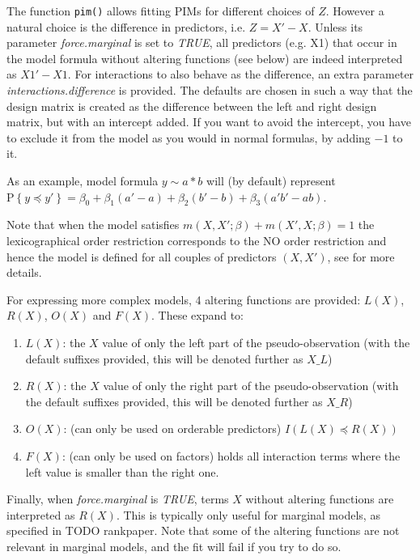 \documentclass[12pt]{article}
\newcommand{\prob}[1]{\text{P}\left\{#1\right\}}
\newcommand{\leqs}{\preccurlyeq}
\begin{document}
The function \texttt{pim()} allows fitting PIMs for different choices of $Z$. However a natural choice is the difference in predictors, i.e. $Z = X' - X$. Unless its parameter \emph{force.marginal} is set to \emph{TRUE}, all predictors (e.g. X1) that occur in the model formula without altering functions (see below) are indeed interpreted as $X1' - X1$. For interactions to also behave as the difference, an extra parameter \emph{interactions.difference} is provided. The defaults are chosen in such a way that the design matrix is created as the difference between the left and right design matrix, but with an intercept added. If you want to avoid the intercept, you have to exclude it from the model as you would in normal formulas, by adding $-1$ to it.

As an example, model formula $y\sim a*b$ will (by default) represent $\prob{y \leqs y' }=\beta_0+\beta_1  (a'-a) + \beta_2  (b'-b) + \beta_3  (a'b' - ab)$.

Note that when the model satisfies $m(X,X';\beta) + m(X',X;\beta) = 1$ the lexicographical order restriction corresponds to the NO order restriction and hence the model is defined for all couples of predictors $(X,X')$, see \cite{Thas2012} for more details. 

For expressing more complex models, 4 altering functions are provided: $L(X)$, $R(X)$, $O(X)$ and $F(X)$. These expand to:
\begin{enumerate}
\item $L(X)$: the $X$ value of only the left part of the pseudo-observation (with the default suffixes provided, this will be denoted further as $X \_ L$)
\item $R(X)$: the $X$ value of only the right part of the pseudo-observation (with the default suffixes provided, this will be denoted further as $X \_ R$)
\item $O(X)$: (can only be used on orderable predictors) $I\left( L(X) \leqs R(X) \right)$
\item $F(X)$: (can only be used on factors) holds all interaction terms where the left value is smaller than the right one.
\end{enumerate} 

Finally, when \emph{force.marginal} is \emph{TRUE}, terms $X$ without altering functions are interpreted as $R(X)$. This is typically only useful for marginal models, as specified in TODO rankpaper. Note that some of the altering functions are not relevant in marginal models, and the fit will fail if you try to do so.
\end{document}
